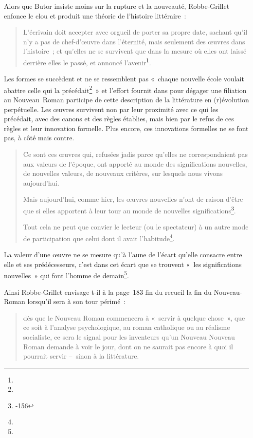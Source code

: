 \documentclass[12pt, a4paper]{article}
\begin{document}
Alors que Butor insiste moins sur la rupture et la nouveauté, Robbe-Grillet enfonce le clou et produit une théorie de l'histoire littéraire~:
\begin{quote}
     L'écrivain doit accepter avec orgueil de porter sa propre date, sachant qu'il n'y a pas de chef-d'œuvre dans l'éternité, mais seulement des œuvres dans l'histoire~; et qu'elles ne se survivent que dans la mesure où elles ont laissé derrière elles le passé, et annoncé l'avenir\footnote{}.
\end{quote}
Les formes se succèdent et ne se ressemblent pas «~chaque nouvelle école voulait abattre celle qui la précédait\footnote{}~» et l'effort fournit dans \punr{} pour dégager une filiation au Nouveau~Roman participe de cette description de la littérature en (r)évolution perpétuelle. Les œuvres survivent non par leur proximité avec ce qui les précédait, avec des canons et des règles établies, mais bien par le refus de ces règles et leur innovation formelle. Plus encore, ces innovations formelles ne se font pas, à côté mais contre.
\begin{quote}
    Ce sont ces œuvres qui, refusées jadis parce qu’elles ne correspondaient pas aux valeurs de l’époque, ont apporté au monde des significations nouvelles, de nouvelles valeurs, de nouveaux critères, sur lesquels nous vivons aujourd’hui.

    Mais aujourd’hui, comme hier, les œuvres nouvelles n’ont de raison d’être que si elles apportent à leur tour au monde de nouvelles significations\footnote{-156}.

    Tout cela ne peut que convier le lecteur (ou le spectateur) à un autre mode de participation que celui dont il avait l’habitude\footnote{}.
\end{quote}

La valeur d'une œuvre ne se mesure qu'à l'aune de l'écart qu'elle consacre entre elle et ses prédécesseurs, c'est dans cet écart que se trouvent «~les significations nouvelles~» qui font l'homme de demain\footnote{}.

Ainsi Robbe-Grillet envisage t-il à la page~183 fin du recueil la fin du Nouveau-Roman lorsqu'il sera à son tour périmé~:
\begin{quote}
   dès que le Nouveau Roman commencera à «~servir à quelque chose~», que ce soit à l’analyse psychologique, au roman catholique ou au réalisme socialiste, ce sera le signal pour les inventeurs qu’un Nouveau Nouveau Roman demande à voir le jour, dont on ne saurait pas encore à quoi il pourrait servir –~sinon à la littérature.
\end{quote}
\end{document}
